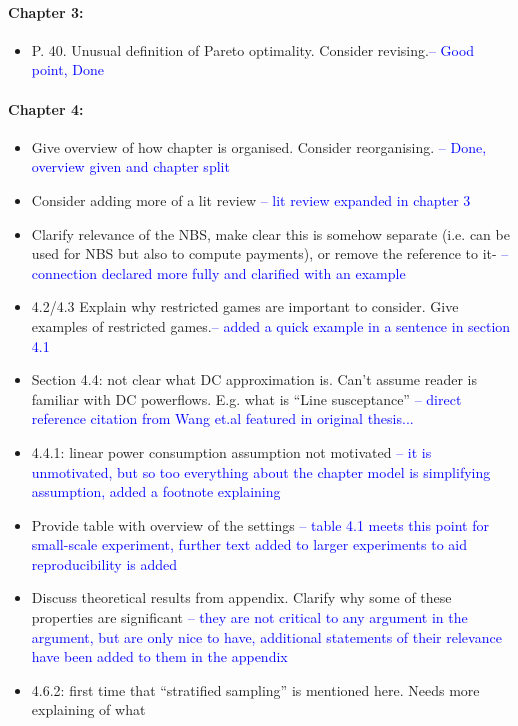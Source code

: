 \documentclass{article}
\begin{document}
\paragraph{Chapter 3:}\begin{itemize}
\item	P. 40. Unusual definition of Pareto optimality. Consider revising.\textcolor{blue}{-- Good point, Done}
\end{itemize}
\paragraph{Chapter 4:}\begin{itemize}
\item	Give overview of how chapter is organised. Consider reorganising. \textcolor{blue}{-- Done, overview given and chapter split}
\item	Consider adding more of a lit review \textcolor{blue}{-- lit review expanded in chapter 3}
\item	Clarify relevance of the NBS, make clear this is somehow separate (i.e. can be used for NBS
but also to compute payments), or remove the reference to it- \textcolor{blue}{-- connection declared more fully and clarified with an example}
\item	4.2/4.3 Explain why restricted games are important to consider. Give examples of restricted
games.\textcolor{blue}{-- added a quick example in a sentence in section 4.1}
\item	Section 4.4: not clear what DC approximation is. Can’t assume reader is familiar with DC
powerflows. E.g. what is “Line susceptance” \textcolor{blue}{-- direct reference citation from Wang et.al featured in original thesis...}
\item	4.4.1: linear power consumption assumption not motivated \textcolor{blue}{-- it is unmotivated, but so too everything about the chapter model is simplifying assumption, added a footnote explaining}
\item	Provide table with overview of the settings \textcolor{blue}{-- table 4.1 meets this point for small-scale experiment, further text added to larger experiments to aid reproducibility is added}
\item	Discuss theoretical results from appendix. Clarify why some of these properties are
significant \textcolor{blue}{-- they are not critical to any argument in the argument, but are only nice to have, additional statements of their relevance have been added to them in the appendix}
\item	4.6.2: first time that “stratified sampling” is mentioned here. Needs more explaining of what

\end{itemize}
\end{document}
